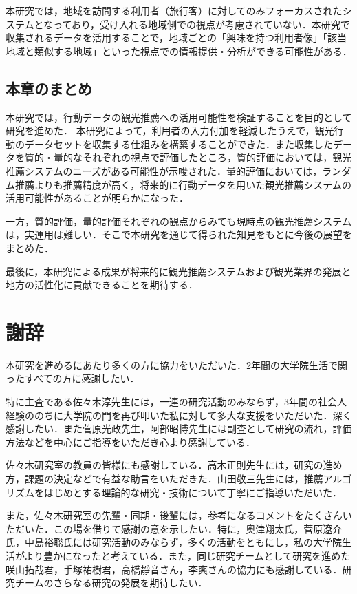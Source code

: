 \documentclass{jsarticle}
\begin{document}
本研究では，地域を訪問する利用者（旅行客）に対してのみフォーカスされたシステムとなっており，受け入れる地域側での視点が考慮されていない．本研究で収集されるデータを活用することで，地域ごとの「興味を持つ利用者像」「該当地域と類似する地域」といった視点での情報提供・分析ができる可能性がある．

\subsection{本章のまとめ}

本研究では，行動データの観光推薦への活用可能性を検証することを目的として研究を進めた．
本研究によって，利用者の入力付加を軽減したうえで，観光行動のデータセットを収集する仕組みを構築することができた．また収集したデータを質的・量的なそれぞれの視点で評価したところ，質的評価においては，観光推薦システムのニーズがある可能性が示唆された．量的評価においては，ランダム推薦よりも推薦精度が高く，将来的に行動データを用いた観光推薦システムの活用可能性があることが明らかになった．

一方，質的評価，量的評価それぞれの観点からみても現時点の観光推薦システムは，実運用は難しい．そこで本研究を通じて得られた知見をもとに今後の展望をまとめた．

最後に，本研究による成果が将来的に観光推薦システムおよび観光業界の発展と地方の活性化に貢献できることを期待する．

\newpage

\section*{謝辞}

本研究を進めるにあたり多くの方に協力をいただいた．2年間の大学院生活で関ったすべての方に感謝したい．

特に主査である佐々木淳先生には，一連の研究活動のみならず，3年間の社会人経験ののちに大学院の門を再び叩いた私に対して多大な支援をいただいた．深く感謝したい．また菅原光政先生，阿部昭博先生には副査として研究の流れ，評価方法などを中心にご指導をいただき心より感謝している．

佐々木研究室の教員の皆様にも感謝している．高木正則先生には，研究の進め方，課題の決定などで有益な助言をいただきた．山田敬三先生には，推薦アルゴリズムをはじめとする理論的な研究・技術について丁寧にご指導いただいた．

また，佐々木研究室の先輩・同期・後輩には，参考になるコメントをたくさんいただいた．この場を借りて感謝の意を示したい．特に，奧津翔太氏，菅原遼介氏，中島裕聡氏には研究活動のみならず，多くの活動をともにし，私の大学院生活がより豊かになったと考えている．また，同じ研究チームとして研究を進めた咲山拓哉君，手塚祐樹君，高橋靜音さん，李爽さんの協力にも感謝している．研究チームのさらなる研究の発展を期待したい．
\end{document}
